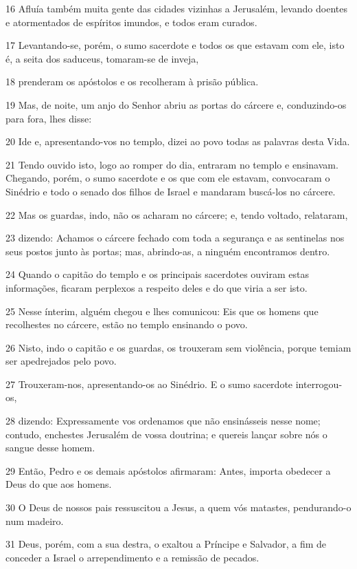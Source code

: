 \par 16 Afluía também muita gente das cidades vizinhas a Jerusalém, levando doentes e atormentados de espíritos imundos, e todos eram curados.
\par 17 Levantando-se, porém, o sumo sacerdote e todos os que estavam com ele, isto é, a seita dos saduceus, tomaram-se de inveja,
\par 18 prenderam os apóstolos e os recolheram à prisão pública.
\par 19 Mas, de noite, um anjo do Senhor abriu as portas do cárcere e, conduzindo-os para fora, lhes disse:
\par 20 Ide e, apresentando-vos no templo, dizei ao povo todas as palavras desta Vida.
\par 21 Tendo ouvido isto, logo ao romper do dia, entraram no templo e ensinavam. Chegando, porém, o sumo sacerdote e os que com ele estavam, convocaram o Sinédrio e todo o senado dos filhos de Israel e mandaram buscá-los no cárcere.
\par 22 Mas os guardas, indo, não os acharam no cárcere; e, tendo voltado, relataram,
\par 23 dizendo: Achamos o cárcere fechado com toda a segurança e as sentinelas nos seus postos junto às portas; mas, abrindo-as, a ninguém encontramos dentro.
\par 24 Quando o capitão do templo e os principais sacerdotes ouviram estas informações, ficaram perplexos a respeito deles e do que viria a ser isto.
\par 25 Nesse ínterim, alguém chegou e lhes comunicou: Eis que os homens que recolhestes no cárcere, estão no templo ensinando o povo.
\par 26 Nisto, indo o capitão e os guardas, os trouxeram sem violência, porque temiam ser apedrejados pelo povo.
\par 27 Trouxeram-nos, apresentando-os ao Sinédrio. E o sumo sacerdote interrogou-os,
\par 28 dizendo: Expressamente vos ordenamos que não ensinásseis nesse nome; contudo, enchestes Jerusalém de vossa doutrina; e quereis lançar sobre nós o sangue desse homem.
\par 29 Então, Pedro e os demais apóstolos afirmaram: Antes, importa obedecer a Deus do que aos homens.
\par 30 O Deus de nossos pais ressuscitou a Jesus, a quem vós matastes, pendurando-o num madeiro.
\par 31 Deus, porém, com a sua destra, o exaltou a Príncipe e Salvador, a fim de conceder a Israel o arrependimento e a remissão de pecados.
